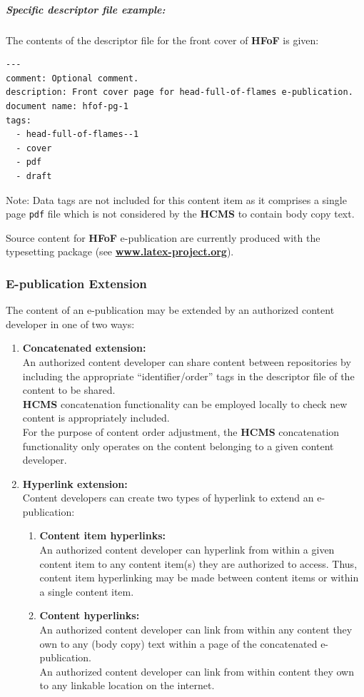 \documentclass[12pt]{article}
\begin{document}
\subparagraph{\bf Specific descriptor file example:} The contents of the descriptor file for the front cover of {\bf \small HFoF} is given:

\begin{verbatim}
---
comment: Optional comment.
description: Front cover page for head-full-of-flames e-publication.
document name: hfof-pg-1
tags:
  - head-full-of-flames--1
  - cover
  - pdf
  - draft
\end{verbatim}

Note: Data tags are not included for this content item as it comprises a single page {\tt \small pdf} file which is not considered by the {\bf \small HCMS} to contain body copy text.

Source content for {\bf \small HFoF} e-publication are currently produced with the \LaTeXe\,typesetting package (see \href{http://www.latex-project.org/}{\bf www.latex-project.org}).

\subsubsection{E-publication Extension}
The content of an e-publication may be extended by an authorized content developer in one of two ways:
\begin{enumerate}
\item {\bf Concatenated extension:}\\
An authorized content developer can share content between repositories by including the appropriate ``identifier/order'' tags in the descriptor file of the content to be shared.\\
{\bf \small HCMS} concatenation functionality can be employed locally to check new content is appropriately included.\\
For the purpose of content order adjustment, the {\bf \small HCMS} concatenation functionality only operates on the content belonging to a given content developer.
\item {\bf Hyperlink extension:}\\
Content developers can create two types of hyperlink to extend an e-publication:
	\begin{enumerate}
	\item {\bf Content item hyperlinks:}\\
	An authorized content developer can hyperlink from within a given content item to any content item(s) they are authorized to access. Thus, content item hyperlinking may be made between content items or within a single content item. 
	\item {\bf Content hyperlinks:}\\
	An authorized content developer can link from within any content they own to any (body copy) text within a page of the concatenated e-publication.\\
	An authorized content developer can link from within content they own to any linkable location on the internet.
 	\end{enumerate}
\end{enumerate}
\end{document}

